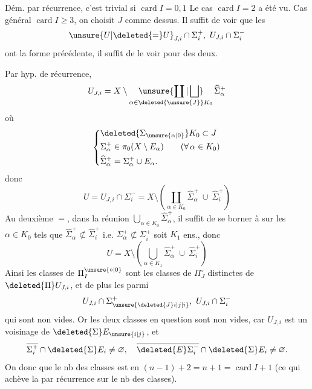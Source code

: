 Dém. par récurrence, c'est trivial si $\operatorname{card} I=0,1$ Le cas $\operatorname{card} I=2$ a été vu. Cas général  $\operatorname{card} I\geq 3$, on choisit $J$ comme dessus. Il suffit de voir que les 
\[
\unsure{U|\deleted{=}U}_{J,i}\cap\Sigma_i^+,\ U_{J,i}\cap\Sigma_i^-
\]
ont la forme précédente, il suffit de le voir pour  des deux.

Par hyp. de récurrence, 
\[
U_{J,i}=X\setminus\mathop{\unsure{\coprod|\bigsqcup}}\limits_{\alpha\in \deleted{\unsure{J}}K_0}\widehat{\Sigma}_\alpha^+
\]
où
\[
\left\{\begin{aligned}
&\deleted{\Sigma_{\unsure{\alpha|0}}}K_0\subset J\\
&\Sigma_\alpha^+\in\pi_0(X\setminus E_\alpha)\qquad (\forall\,\alpha\in K_0)\\
&\widehat{\Sigma}_\alpha^+=\Sigma_\alpha^+\cup E_\alpha.
\end{aligned}\right.
\]
 donc
\[
U=U_{J,i}\cap\Sigma_i^-=X\setminus\left(\coprod_{\alpha\in K_0}\widehat{\Sigma}_\alpha^+\ \cup\ \widehat{\Sigma}_i^+\right)
\]
 Au deuxième $=$, dans la  réunion $\bigcup_{\alpha\in K_0}\widehat{\Sigma}_\alpha^+$, il suffit de se borner à  sur les \deleted{$\Sigma$} $\alpha\in K_0$ tels que $\widehat{\Sigma}_\alpha^+\not\subset\widehat{\Sigma}_i^+$ i.e. $\Sigma_\alpha^+\not\subset\Sigma_i^+$ soit $K_1$  ens., donc
\[
U=X\setminus\left(\bigcup_{\alpha\in K_1}\widehat{\Sigma}_\alpha^+\ \cup\ \widehat{\Sigma}_i^+\right)
\]
Ainsi les classes de $\Pi_I^{\unsure{\circ|0}}$ sont les classes de $\Pi_J^\circ$ distinctes de $\deleted{\Pi}U_{J,i}$, et de plus les  parmi
\[
U_{J,i}\cap\Sigma_{\unsure{\deleted{J}i|j|i}}^+,\ U_{J,i}\cap\Sigma_i^-
\]
qui sont non vides. Or les deux classes en question sont non vides, car  $U_{J,i}$ est un voisinage de $\deleted{\Sigma}E_{\unsure{i|j}}$, et
\[
\overline{\Sigma_i^+}\cap\deleted{\Sigma}E_i\ne\varnothing,\quad
\overline{\deleted{E}\Sigma_i^-}\cap\deleted{\Sigma}E_i\ne\varnothing.
\]
On  donc que le nb des classes est en  $(n-1)+2=n+1=\operatorname{card} I+1$ (ce qui achève  la  par récurrence sur le nb des classes).

